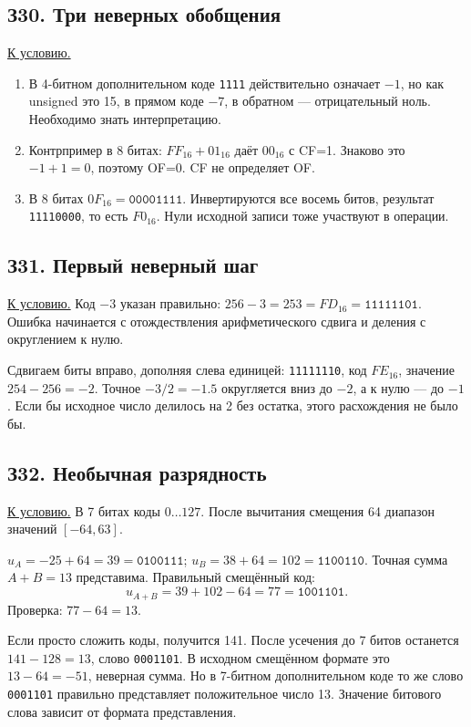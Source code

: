 \subsection*{З30. Три неверных обобщения}\label{sol:z30}
\hyperref[task:z30]{К условию.}
\begin{enumerate}
    \item В 4-битном дополнительном коде \texttt{1111} действительно означает $-1$, но как unsigned это 15, в прямом коде $-7$, в обратном --- отрицательный ноль. Необходимо знать интерпретацию.
    \item Контрпример в 8 битах: $FF_{16}+01_{16}$ даёт $00_{16}$ с CF=1. Знаково это $-1+1=0$, поэтому OF=0. CF не определяет OF.
    \item В 8 битах $0F_{16}=\texttt{00001111}$. Инвертируются все восемь битов, результат \texttt{11110000}, то есть $F0_{16}$. Нули исходной записи тоже участвуют в операции.
\end{enumerate}

\subsection*{З31. Первый неверный шаг}\label{sol:z31}
\hyperref[task:z31]{К условию.}
Код $-3$ указан правильно: $256-3=253=FD_{16}=\texttt{11111101}$.
Ошибка начинается с отождествления арифметического сдвига и деления с округлением к нулю.

Сдвигаем биты вправо, дополняя слева единицей: \texttt{11111110}, код $FE_{16}$, значение $254-256=-2$.
Точное $-3/2=-1.5$ округляется вниз до $-2$, а к нулю --- до $-1$. Если бы исходное число делилось на 2 без остатка, этого расхождения не было бы.

\subsection*{З32. Необычная разрядность}\label{sol:z32}
\hyperref[task:z32]{К условию.}
В 7 битах коды $0\ldots127$. После вычитания смещения 64 диапазон значений $[-64,63]$.

$u_A=-25+64=39=\texttt{0100111}$;
$u_B=38+64=102=\texttt{1100110}$.
Точная сумма $A+B=13$ представима. Правильный смещённый код:
\[
u_{A+B}=39+102-64=77=\texttt{1001101}.
\]
Проверка: $77-64=13$.

Если просто сложить коды, получится 141. После усечения до 7 битов останется $141-128=13$, слово \texttt{0001101}. В исходном смещённом формате это $13-64=-51$, неверная сумма. Но в 7-битном дополнительном коде то же слово \texttt{0001101} правильно представляет положительное число 13. Значение битового слова зависит от формата представления.

